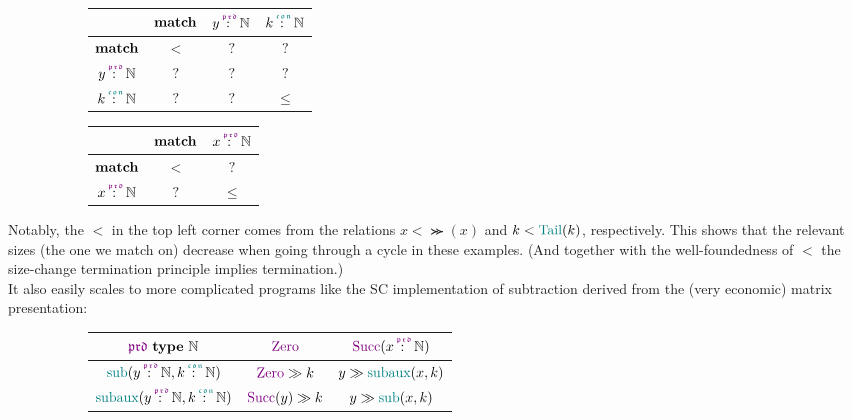 \begin{figure}[H]
  \begin{subfigure}[t]{0.4\textwidth}
    \scriptsize
    \begin{tabular}{c|ccc}
        \diagbox{$\plus$}{$\plus$}
      & $\mathbf{match}$
      & $y \prd \Nat$
      & $k \con \Nat$
      \\
      \hline
        $\mathbf{match}$
      & $<$
      & $?$
      & $?$
      \\
        $y \prd \Nat$
      & $?$
      & $?$
      & $?$
      \\
        $k \con \Nat$
      & $?$
      & $?$
      & $\leq$
      \\
    \end{tabular}
  \end{subfigure}
  \begin{subfigure}[t]{0.4\textwidth}
    \scriptsize
    \begin{tabular}{c|cc}
        \diagbox{$\const$}{$\const$}
      & $\mathbf{match}$
      & $x \prd \Nat$
      \\
      \hline
        $\mathbf{match}$
      & $<$ & $?$
      \\
        $x \prd \Nat$
      & $?$ & $\leq$
      \\
    \end{tabular}
  \end{subfigure}
\end{figure}

Notably, the $<$ in the top left corner comes from the relations $x < \Succ(x)$ and $k < \Tail(k)$, respectively.
This shows that the relevant sizes (the one we match on) decrease when going through a cycle in these examples.
(And together with the well-foundedness of $<$ the size-change termination principle implies termination.)
\\
It also easily scales to more complicated programs like the SC implementation of subtraction derived from the (very economic) matrix presentation:

\begin{figure}[H]
  \begin{subfigure}[t]{0.5\textwidth}
    \scriptsize
    \begin{tabular}{c|cc}
        $\polprd\ \type\ \Nat$
      & $\Zero$
      & $\Succ(x \prd \Nat)$
      \\
      \hline
        $\sub(y \prd \Nat,k \con \Nat)$
      & $\Zero \mkCmd k$
      & $y \mkCmd \subaux(x,k)$
      \\
        $\subaux(y \prd \Nat,k \con \Nat)$
      & $\Succ(y) \mkCmd k$
      & $y \mkCmd \sub(x,k)$
      \\
    \end{tabular}
  \end{subfigure}
\end{figure}

